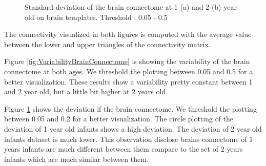 \documentclass[]{spie}  %
\begin{document}
\begin{figure}
\centering 
{}
\caption[Standard deviation of the brain connectome at 1 (a) and 2 (b) year old on brain templates ]{Standard deviation of the brain connectome at 1 (a) and 2 (b) year old on brain templates. Threshold : 0.05 - 0.5}
\label{fig:DeviationBrainConnectome}
\end{figure} 

The connectivity visualized in both figures is computed with the average value between the lower and upper triangles of the connectivity matrix.

Figure \ref{fig:VariabilityBrainConnectome} is showing the variability of the brain connectome at both ages. We threshold the plotting between 0.05 and 0.5 for a better visualization.
These results show a variability pretty constant between 1 and 2 year old, but a little bit higher at 2 years old.

Figure \ref{fig:DeviationBrainConnectome} shows the deviation if the brain connectome. 
We threshold the plotting between 0.05 and 0.2 for a better visualization. The circle plotting of the deviation of 1 year old infants shows a high deviation. The deviation of 2 year old infants dataset is much lower. This observation disclose brains connectome of 1 years infants are much different between them compare to the set of 2 years infants which are much similar between them.
\end{document}

